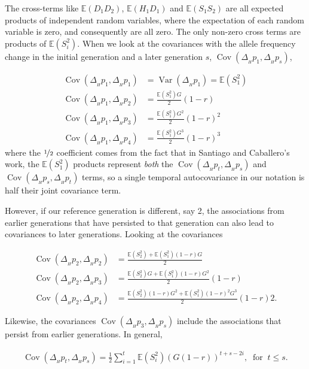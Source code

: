 \documentclass[11pt]{article}
\newcommand{\E}{\mathbb{E}}
\DeclareMathOperator{\var}{Var}
\DeclareMathOperator{\cov}{Cov}
\begin{document}
The cross-terms like $\E(D_1 D_2)$, $\E(H_1 D_1)$ and $\E(S_1 S_2)$ are all expected
products of independent random variables, where the expectation of each random
variable is zero, and consequently are all zero. The only non-zero cross terms
are products of $\E(S_i^2)$. When we look at the covariances with the allele
frequency change in the initial generation and a later generation $s$,
$\cov(\Delta_{_H} p_1, \Delta_{_H} p_s)$,

\begin{align}
  \cov(\Delta_{_H} p_1, \Delta_{_H} p_1) &= \var(\Delta_{_H} p_1) = \E(S_1^2) \\
  \cov(\Delta_{_H} p_1, \Delta_{_H} p_2) &= \frac{\E(S_1^2) G}{2} (1-r) \\
  \cov(\Delta_{_H} p_1, \Delta_{_H} p_3) &= \frac{\E(S_1^2) G^2 }{2}(1-r)^2\\
  \cov(\Delta_{_H} p_1, \Delta_{_H} p_4) &= \frac{\E(S_1^2) G^3 }{2} (1-r)^3
\end{align}
%
where the $\nicefrac{1}{2}$ coefficient comes from the fact that in Santiago
and Caballero's work, the $\E(S_1^2)$ products represent \emph{both} the
$\cov(\Delta_{_H} p_t, \Delta_{_H} p_s)$ and $\cov(\Delta_{_H} p_s, \Delta_{_H}
p_t)$ terms, so a single temporal autocovariance in our notation is half 
their joint covariance term.

However, if our reference generation is different, say 2, the associations from
earlier generations that have persisted to that generation can also lead to
covariances to later generations. Looking at the covariances 

\begin{align}
  \cov(\Delta_{_H} p_2, \Delta_{_H} p_2) &= \frac{\E(S_2^2) + \E(S_1^2) (1-r) G}{2} \\
  \cov(\Delta_{_H} p_2, \Delta_{_H} p_3) &= \frac{\E(S_2^2) G  + \E(S_1^2) (1-r) G^2}{2} (1-r) \\
  \cov(\Delta_{_H} p_2, \Delta_{_H} p_4) &= \frac{\E(S_2^2) (1-r) G^2 + \E(S_1^2) (1-r)^2 G^3}{2} (1-r)2.
\end{align}

Likewise, the covariances $\cov(\Delta_{_H} p_3, \Delta_{_H} p_s)$ include the
associations that persist from earlier generations. In general, 

\begin{align}
  \cov(\Delta_{_H} p_t, \Delta_{_H} p_s) = \frac{1}{2}\sum_{i=1}^{t} \E(S_i^2) \left(G (1-r)\right)^{t + s - 2i}, \; \; \text{for} \; \; t \le s.
  \label{eq:sc-cov}
\end{align}
\end{document}
